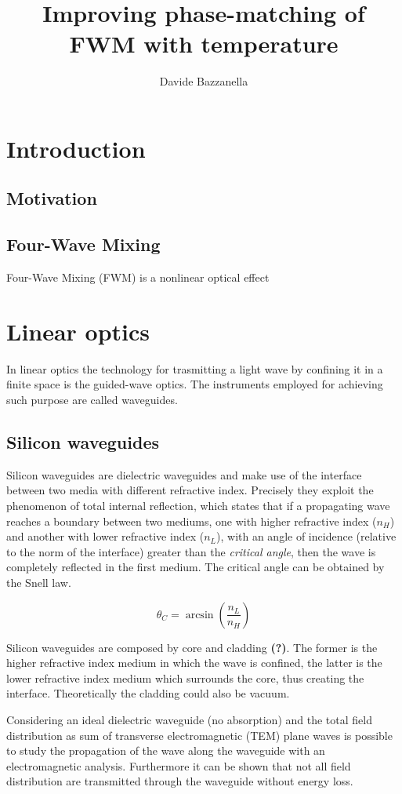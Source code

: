 \documentclass[12pt,a4paper]{article}
\author{Davide Bazzanella}
\title{Improving phase-matching of FWM with temperature}
\begin{document}

\newpage
\section{Introduction}
\subsection{Motivation}
\subsection{Four-Wave Mixing}
Four-Wave Mixing (FWM) is a nonlinear optical effect

\section{Linear optics}
In linear optics the technology for trasmitting a light wave by confining it in a finite space is the guided-wave optics.
The instruments employed for achieving such purpose are called waveguides.
\subsection{Silicon waveguides}
Silicon waveguides are dielectric waveguides and make use of the interface between two media with different refractive index.
Precisely they exploit the phenomenon of total internal reflection, which states that if a propagating wave reaches a boundary between two mediums, one with higher refractive index ($n_H$) and another with lower refractive index ($n_L$), with an angle of incidence (relative to the norm of the interface) greater than the \textit{critical angle}, then the wave is completely reflected in the first medium.
The critical angle can be obtained by the Snell law.

$$	\theta_C = \arcsin \left( \frac{n_L}{n_H} \right)$$

Silicon waveguides are composed by core and cladding \textbf{(?)}. %
The former is the higher refractive index medium in which the wave is confined, the latter is the lower refractive index medium which surrounds the core, thus creating the interface. Theoretically the cladding could also be vacuum.

Considering an ideal dielectric waveguide (no absorption) and the total field distribution as sum of transverse electromagnetic (TEM) plane waves is possible to study the propagation of the wave along the waveguide with an electromagnetic analysis.
Furthermore it can be shown that not all field distribution are transmitted through the waveguide without energy loss.
\end{document}
